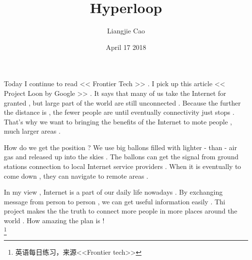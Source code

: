 \documentclass[50pt]{article}
\begin{document}
\title{Hyperloop}
\author{Liangjie Cao}
\date{April 17 2018}
\maketitle
\par
Today I continue to read << Frontier Tech >> . I pick up this article << Project Loon by Google >> . It says that many of us take the Internet for granted , but large part of the world are still unconnected . Because the further the distance is , the fewer people are until eventually connectivity just stops . That's why we want to bringing the benefits of the Internet to mote people , much larger areas .  \\
\par
How do we get the position ? We use big ballons filled with lighter - than - air gas and released up into the skies . The ballons can get the signal from ground stations connection to local Internet service providers . When it is eventually to come down , they can navigate to remote areas . \\
\par
In my view , Internet is a part of our daily life nowadays . By exchanging message from person to person , we can get useful information easily . Thi project makes the the truth to connect more people in more places around the world . How amazing the plan is ! \\
\footnote{\centering 英语每日练习，来源<<Frontier tech>>}
\end{document}
